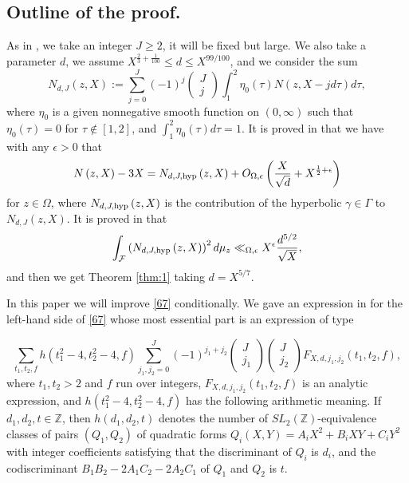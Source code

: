 \documentclass[12pt]{amsart}
\theoremstyle{definition}
\numberwithin{equation}{section}
\begin{document}
\subsection{Outline of the proof.} As in \cite{Biro}, we take an integer $
J\ge 2$, it will
be fixed but large. We also take a parameter $d$, we assume $X^{\frac
23+\frac 1{100}}\le d\le X^{99/100}$, and we consider the sum
\[N_{d,J}\left(z,X\right):=\sum_{j=0}^J\left(-1\right)^j\left(\begin{array}{c}
J\\
j\end{array}
\right)\int_1^2\eta_0\left(\tau\right)N\left(z,X-jd\tau\right)d\tau
,\]
where $\eta_0$ is a given nonnegative smooth function on $\left(0
,\infty\right)$ such that $\eta_0\left(\tau\right)=0$
for $\tau\notin\left[1,2\right]$, and $\int_1^2\eta_0\left(\tau\right
)d\tau =1.$ It is proved in \cite{Biro}
that we have with any $\epsilon >0$ that
\[N\left(z,X\right)-3X=N_{d,J,{\rm h}{\rm y}{\rm p}}\left(z,X\right
)+O_{\Omega ,\epsilon}\left(\frac X{\sqrt {d}}+X^{\frac 12+\epsilon}\right
)\]
for $z\in\Omega$, where $N_{d,J,{\rm h}{\rm y}{\rm p}}\left(z,X\right
)$ is the contribution of the hyperbolic
$\gamma\in\Gamma$ to $N_{d,J}\left(z,X\right)$. It is proved in \cite{Biro} that
\begin{equation}\int_{\mathcal F}\left(N_{d,J,{\rm h}{\rm y}{\rm p}}\left
(z,X\right)\right)^2d\mu_z\ll_{\Omega ,\epsilon}X^{\epsilon}\frac {
d^{5/2}}{\sqrt {X}},\label{67}\end{equation}
and then we get Theorem \ref{thm:1} taking $d=X^{5/7}$.

In this paper we will improve \eqref{67} conditionally.
We gave an expression in \cite{Biro} for the left-hand
side of \eqref{67} whose most essential part is an expression of type

\begin{equation}\sum_{t_1,t_2,f}h\left(t_1^2-4,t_2^2-4,f\right)\sum_{
j_1,j_2=0}^J\left(-1\right)^{j_1+j_2}\left(\begin{array}{c}
J\\
j_1\end{array}
\right)\left(\begin{array}{c}
J\\
j_2\end{array}
\right)F_{X,d,j_1,j_2}\left(t_1,t_2,f\right),\label{68}\end{equation}
where $t_1,t_2>2$ and $f$ run over integers, $F_{X,d,j_1,j_2}\left
(t_1,t_2,f\right)$ is
an analytic expression, and $h\left(t_1^2-4,t_2^2-4,f\right)$ has the
following arithmetic meaning. If $d_1,d_2,t\in\mathbb Z$, then
$h\left(d_1,d_2,t\right)$ denotes the number of  $SL_2(\mathbb Z)$-equivalence
classes of pairs $\left(Q_1,Q_2\right)$ of quadratic forms $Q_i\left
(X,Y\right)=A_iX^2+B_iXY+C_iY^2$ with
integer coefficients satisfying that the discriminant of
$Q_i$ is $d_i$, and the codiscriminant $B_1B_2-2A_1C_2-2A_2C_1$ of
$Q_1$ and $Q_2$ is $t$.
\end{document}
